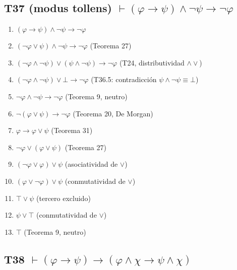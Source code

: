 \documentclass[a4paper,11pt]{article}
\begin{document}
\subsection{T37 (modus tollens) $\vdash (\varphi \rightarrow \psi) \land \neg\psi \rightarrow \neg\varphi$}

\begin{enumerate}
    \item $(\varphi \rightarrow \psi) \land \neg\psi \rightarrow \neg\varphi$
    \item $(\neg\varphi \lor \psi) \land \neg\psi \rightarrow \neg\varphi$ \hfill (Teorema 27)
    \item $(\neg\varphi \land \neg\psi) \lor (\psi \land \neg\psi) \rightarrow \neg\varphi$ \hfill (T24, distributividad $\land\lor$)
    \item $(\neg\varphi \land \neg\psi) \lor \bot \rightarrow \neg\varphi$ \hfill (T36.5: contradicción $\psi \land \neg\psi \equiv \bot$)
    \item $\neg\varphi \land \neg\psi \rightarrow \neg\varphi$ \hfill (Teorema 9, neutro)
    \item $\neg(\varphi \lor \psi) \rightarrow \neg\varphi$ \hfill (Teorema 20, De Morgan)
    \item $\varphi \rightarrow \varphi \lor \psi$ \hfill (Teorema 31)
    \item $\neg\varphi \lor (\varphi \lor \psi)$ \hfill (Teorema 27)
    \item $(\neg\varphi \lor \varphi) \lor \psi$ \hfill (asociatividad de $\lor$)
    \item $(\varphi \lor \neg\varphi) \lor \psi$ \hfill (conmutatividad de $\lor$)
    \item $\top \lor \psi$ \hfill (tercero excluido)
    \item $\psi \lor \top$ \hfill (conmutatividad de $\lor$)
    \item $\top $ \hfill (Teorema 9, neutro)
\end{enumerate}

\subsection{T38 $\vdash (\varphi \rightarrow \psi) \rightarrow (\varphi \land \chi \rightarrow \psi \land \chi)$}
\end{document}
